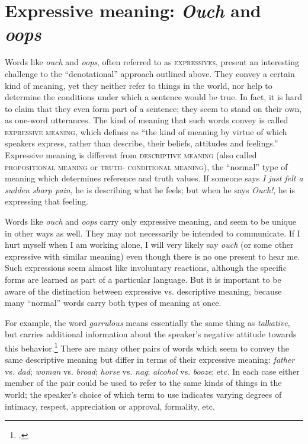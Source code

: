 \section{Expressive meaning: \textit{Ouch} and \textit{oops}}\label{sec:2.6}

Words like \textit{ouch} and \textit{oops}, often referred to as \textsc{expressives}, present an interesting challenge to the “denotational” approach outlined above. They convey a certain kind of meaning, yet they neither refer to things in the world, nor help to determine the conditions under which a sentence would be true. In fact, it is hard to claim that they even form part of a sentence; they seem to stand on their own, as one-word utterances. The kind of meaning that such words convey is called \textsc{expressive meaning}, which \citet[44]{Lyons1995} defines as “the kind of meaning by virtue of which speakers express, rather than describe, their beliefs, attitudes and feelings.” Expressive meaning is different from \textsc{descriptive meaning} (also called \textsc{propositional meaning} or \textsc{truth-} \textsc{conditional} \textsc{meaning}), the “normal” type of meaning which determines reference and truth values. If someone says \textit{I just felt a sudden sharp pain}, he is describing what he feels; but when he says \textit{Ouch!}, he is expressing that feeling.



Words like \textit{ouch} and \textit{oops} carry only expressive meaning, and seem to be unique in other ways as well. They may not necessarily be intended to communicate. If I hurt myself when I am working alone, I will very likely say \textit{ouch} (or some other expressive with similar meaning) even though there is no one present to hear me. Such expressions seem almost like involuntary reactions, although the specific forms are learned as part of a particular language. But it is important to be aware of the distinction between expressive vs. descriptive meaning, because many “normal” words carry both types of meaning at once.



For example, the word \textit{garrulous} means essentially the same thing as \textit{talkative}, but carries additional information about the speaker’s negative attitude towards this behavior.\footnote{\citet{Barker2002}.} There are many other pairs of words which seem to convey the same descriptive meaning but differ in terms of their expressive meaning: \textit{father} vs. \textit{dad}; \textit{woman} vs. \textit{broad}; \textit{horse} vs. \textit{nag}; \textit{alcohol} vs. \textit{booze}; etc. In each case either member of the pair could be used to refer to the same kinds of things in the world; the speaker’s choice of which term to use indicates varying degrees of intimacy, respect, appreciation or approval, formality, etc.


